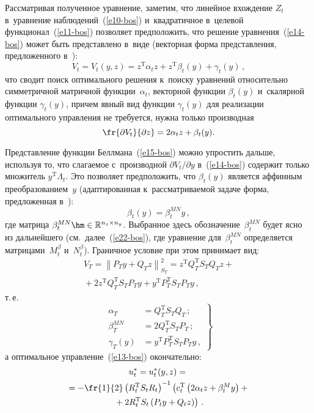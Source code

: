 \begin{multicols}{2}
     Рассматривая полученное уравнение, заметим, что линейное вхождение 
$Z_t$ в~уравнение наблюдений~(\ref{e10-bos}) и~квадратичное в~целевой 
функционал~(\ref{e11-bos}) позволяет предположить, что решение 
уравнения~(\ref{e14-bos}) может быть представлено в~виде (векторная форма 
представления, предложенного в~\cite{16-bos}):
     \begin{equation}
     V_t=V_t(y,z)=z^{\mathrm{T}} \alpha_t z+z^{\mathrm{T}}\beta_t(y)+\gamma_t(y)\,,
     \label{e15-bos}
     \end{equation}
что сводит поиск оптимального решения к~поиску уравнений относительно 
симметричной матричной функции~$\alpha_t$, векторной функции 
$\beta_t(y)$ и~скалярной функции $\gamma_t(y)$, причем явный вид функции 
$\gamma_t(y)$ для реализации оптимального управления не требуется, нужна 
только производная 
$$
\fr{\partial V_t}{\partial z}= 2\alpha_t z+ \beta_t(y).
$$ 
     
     Представление функции Беллмана~(\ref{e15-bos}) можно упростить 
дальше, используя то, что сла\-га\-емое с~производной $\partial V_t/\partial y$ 
в~(\ref{e14-bos}) содержит только множитель $y^{\mathrm{T}}\Lambda_t$. Это позволяет 
предположить, что $\beta_t(y)$ является аффинным преобразованием~$y$ 
(адаптированная к~рассматриваемой задаче форма, предложенная  
в~\cite{17-bos}):
     \begin{equation}
     \beta_t(y)=\beta_t^{MN} y\,,
     \label{e16-bos}
      \end{equation}
где матрица $\beta_t^{MN}\hm\in \mathbb{R}^{n_z\times n_y}$. Выбранное 
здесь обозначение~$\beta_t^{MN}$ будет ясно из дальнейшего (см.\ 
далее~(\ref{e22-bos}), где уравнение для~$\beta_t^{MN}$ определяется 
мат\-ри\-ца\-ми~$M_t^\beta$ и~$N_t^\beta$). Граничное условие при этом 
принимает вид: 
\begin{multline*}
V_T=\left\| P_T y+Q_T z\right\|^2_{S_T} = z^{\mathrm{T}} Q_T^{\mathrm{T}} S_T Q_T z+{}\\
{}+ 2z^{\mathrm{T}} 
Q_T^{\mathrm{T}} S_T P_T y+ y^{\mathrm{T}} P_T^{\mathrm{T}} S_T P_T y\,,
\end{multline*}
 т.\,е.
\begin{equation}
\left.
\begin{array}{rl}
\alpha_T&= Q_T^{\mathrm{T}} S_T Q_T\,;\\[6pt]
\beta_T^{MN}&=2Q_T^{\mathrm{T}} S_T P_T\,;\\[6pt] 
\gamma_T(y)&=y^{\mathrm{T}} P_T^{\mathrm{T}} S_T P_T y\,,
\end{array}
\right\}
\label{e17-bos}
\end{equation}
а оптимальное управление~(\ref{e13-bos}) окончательно:
\begin{multline*}
u_t^* =u_t^*(y,z) ={}\\
{}=-\fr{1}{2}\left( R_t^{\mathrm{T}} S_t R_t\right)^{-1} \left(
\vphantom{R_t^T}
 c_t^{\mathrm{T}} \left( 
2\alpha_t z+\beta_t^M y\right) +{}\right.\\
\left.{}+
2R_t^{\mathrm{T}} S_t\left( P_t y+Q_t z\right)\right)\,.
\end{multline*}
     

\end{multicols}

